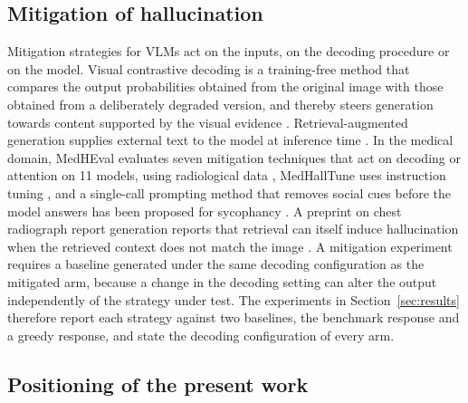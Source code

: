 \documentclass[11pt,a4paper]{article}
\begin{document}
\subsection{Mitigation of hallucination}
\label{subsec:rw_mitigation}

Mitigation strategies for VLMs act on the inputs, on the decoding procedure or on the model. Visual contrastive decoding is a training-free method that compares the output probabilities obtained from the original image with those obtained from a deliberately degraded version, and thereby steers generation towards content supported by the visual evidence \citep{leng2024vcd}. Retrieval-augmented generation supplies external text to the model at inference time \citep{lewis2020rag}. In the medical domain, MedHEval evaluates seven mitigation techniques that act on decoding or attention on 11 models, using radiological data \citep{chang2025medheval}, MedHallTune uses instruction tuning \citep{yan2025medhalltune}, and a single-call prompting method that removes social cues before the model answers has been proposed for sycophancy \citep{xu2025sycophancy}. A preprint on chest radiograph report generation reports that retrieval can itself induce hallucination when the retrieved context does not match the image \citep{idoko2026retrieval}. A mitigation experiment requires a baseline generated under the same decoding configuration as the mitigated arm, because a change in the decoding setting can alter the output independently of the strategy under test. The experiments in Section~\ref{sec:results} therefore report each strategy against two baselines, the benchmark response and a greedy response, and state the decoding configuration of every arm.

\subsection{Positioning of the present work}
\label{subsec:rw_position}
\end{document}
